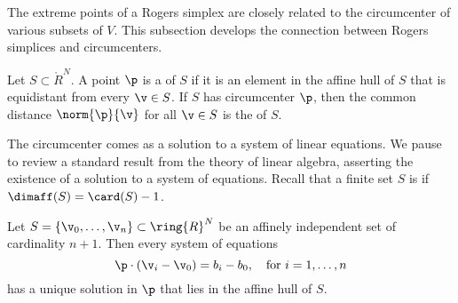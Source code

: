The extreme points of a Rogers simplex are closely related to the
circumcenter of various subsets of $V$.  This subsection develops the
connection between Rogers simplices and circumcenters.

\begin{definition} 
  Let $S\subset\ring{R}^N$.  A point $\p$ is a 
  of $S$ if it is an element in the affine hull of $S$ that is
  equidistant from every $\v\in S$.  If $S$ has circumcenter $\p$,
  then the common distance $\norm{\p}{\v}$ for all $\v\in S$ is the
   of $S$.
\end{definition}

The circumcenter comes as a solution to a system of linear equations.
We pause to review a standard result from the theory of linear
algebra, asserting the existence of a solution to a system of
equations.  Recall that a finite set $S$ is  if $\dimaff(S) = \card(S) -1$.  
%
%

\begin{lemma}\label{lemma:affine-system} 
  Let $S=\{\v_0,\ldots,\v_n\}\subset \ring{R}^N$ be an affinely
  independent set of cardinality $n+1$.  Then every system of
  equations
\[  
\p \cdot (\v_i - \v_0) = b_i-b_0,\quad \text{for } i=1,\ldots,n
\] 
has a unique solution in $\p$ that lies in the affine hull of $S$.
\end{lemma}

